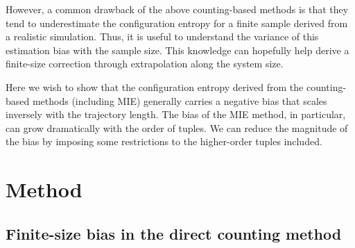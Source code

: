 \documentclass[preprint, superscriptaddress]{revtex4-1}
\begin{document}
However, a common drawback of the above counting-based methods is that
they tend to underestimate the configuration entropy for a finite sample
derived from a realistic simulation.
%
Thus, it is useful to understand the variance of this estimation bias with the sample size.
%
This knowledge can hopefully help derive a finite-size correction
through extrapolation along the system size.

Here we wish to show that the configuration entropy derived
from the counting-based methods (including MIE)
generally carries a negative bias that scales inversely with the trajectory length.
%
The bias of the MIE method, in particular,
can grow dramatically with the order of tuples.
%
We can reduce the magnitude of the bias
by imposing some restrictions to the higher-order tuples included.

\section{Method}

\subsection{Finite-size bias in the direct counting method}
\end{document}
